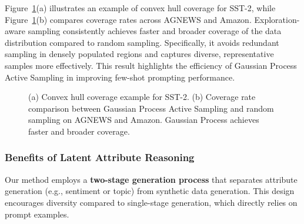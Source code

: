 
Figure~\ref{fig:gp_cover}(a) illustrates an example of convex hull coverage for SST-2, while Figure~\ref{fig:gp_cover}(b) compares coverage rates across AGNEWS and Amazon. Exploration-aware sampling consistently achieves faster and broader coverage of the data distribution compared to random sampling. Specifically, it avoids redundant sampling in densely populated regions and captures diverse, representative samples more effectively. This result highlights the efficiency of Gaussian Process Active Sampling in improving few-shot prompting performance.




\begin{figure}[tbp]
    \centering
    \caption{(a) Convex hull coverage example for SST-2. (b) Coverage rate comparison between Gaussian Process Active Sampling and random sampling on AGNEWS and Amazon. Gaussian Process achieves faster and broader coverage.}
    \label{fig:gp_cover}
\end{figure}

\subsubsection{Benefits of Latent Attribute Reasoning}

Our method employs a \textbf{two-stage generation process} that separates attribute generation (e.g., sentiment or topic) from synthetic data generation. This design encourages diversity compared to single-stage generation, which directly relies on prompt examples.

